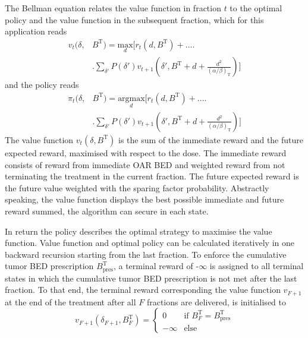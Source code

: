 \documentclass[\relativeRoot/ada.tex]{subfiles}
\begin{document}
The Bellman equation relates the value function in fraction $t$ to the optimal policy and the value function in the subsequent fraction, which for this application reads
\begin{equation}\label{eq:value_function}
    \begin{split}
    v_t(\delta, & B^{\text{T}}) = \underset{d}{\text{max}} \Biggr[
    r_t(d, B^{\text{T}}) + \ldots \Biggr.\\
    & \Biggr. \sum_{\delta'}P(\delta')v_{t+1} \left( \delta', B^{\text{T}} + d + \frac{d^2}{(\alpha / \beta)_\text{T}} \right) \Biggr]
    \end{split}
\end{equation}
and the policy reads
\begin{equation}\label{eq:policy_function}
    \begin{split}
    \pi_t(\delta, & B^{\text{T}}) = \underset{d}{\text{argmax}} \Biggr[
    r_t(d, B^{\text{T}}) + \ldots \Biggr.\\
    & \Biggr. \sum_{\delta'}P(\delta')v_{t+1} \left( \delta', B^{\text{T}} + d + \frac{d^2}{(\alpha / \beta)_\text{T}} \right) \Biggr]
    \end{split}
\end{equation}
The value function $v_t(\delta, B^{\text{T}})$ is the sum of the immediate reward and the future expected reward, maximised with respect to the dose. The immediate reward consists of reward from immediate OAR BED and weighted reward from not terminating the treatment in the current fraction. The future expected reward is the future value weighted with the sparing factor probability. Abstractly speaking, the value function displays the best possible immediate and future reward summed, the algorithm can secure in each state.

In return the policy describes the optimal strategy to maximise the value function. Value function and optimal policy can be calculated iteratively in one backward recursion starting from the last fraction. To enforce the cumulative tumor BED prescription $B_{\text{pres}}^\text{T}$, a terminal reward of -$\infty$ is assigned to all terminal states in which the cumulative tumor BED prescription is not met after the last fraction. To that end, the terminal reward corresponding the value function $v_{F+1}$ at the end of the treatment after all $F$ fractions are delivered, is initialised to
\begin{equation*}
v_{F+1}(\delta_{F+1}, B^\text{T}_{F}) = 
\begin{cases}
0 & \text{if } B^\text{T}_F = B_{\text{pres}}^\text{T} \\
-\infty & \text{else}
\end{cases}
\end{equation*}
\end{document}
